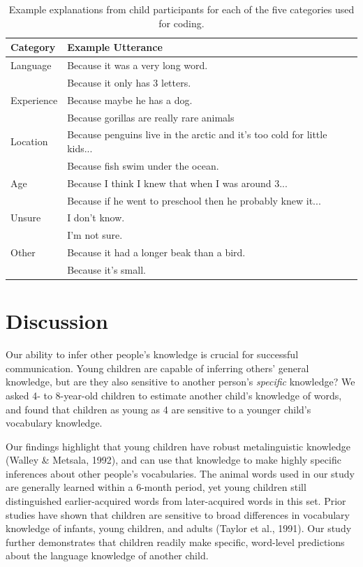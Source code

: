 \documentclass[10pt, letterpaper]{article}
\begin{document}
\begin{table}[tb]
\centering
\begin{tabular}{ll}
  \hline
Category & Example Utterance \\ 
  \hline
Language & Because it was a very long word. \\ 
    & Because it only has 3 letters. \\ 
  Experience & Because maybe he has a dog. \\ 
    & Because gorillas are really rare animals \\ 
  Location & Because penguins live in the arctic and it's too cold for little kids... \\ 
    & Because fish swim under the ocean. \\ 
  Age & Because I think I knew that when I was around 3... \\ 
    & Because if he went to preschool then he probably knew it... \\ 
  Unsure & I don't know. \\ 
    & I'm not sure. \\ 
  Other & Because it had a longer beak than a bird. \\ 
    & Because it's small. \\ 
   \hline
\end{tabular}
\caption{Example explanations from child participants for each of the five categories used for coding.} 
\label{tab:explanations_table}
\end{table}

\hypertarget{discussion}{%
\section{Discussion}\label{discussion}}

Our ability to infer other people's knowledge is crucial for successful
communication. Young children are capable of inferring others' general
knowledge, but are they also sensitive to another person's
\emph{specific} knowledge? We asked 4- to 8-year-old children to
estimate another child's knowledge of words, and found that children as
young as 4 are sensitive to a younger child's vocabulary knowledge.

Our findings highlight that young children have robust metalinguistic
knowledge (Walley \& Metsala, 1992), and can use that knowledge to make
highly specific inferences about other people's vocabularies. The animal
words used in our study are generally learned within a 6-month period,
yet young children still distinguished earlier-acquired words from
later-acquired words in this set. Prior studies have shown that children
are sensitive to broad differences in vocabulary knowledge of infants,
young children, and adults (Taylor et al., 1991). Our study further
demonstrates that children readily make specific, word-level predictions
about the language knowledge of another child.
\end{document}
